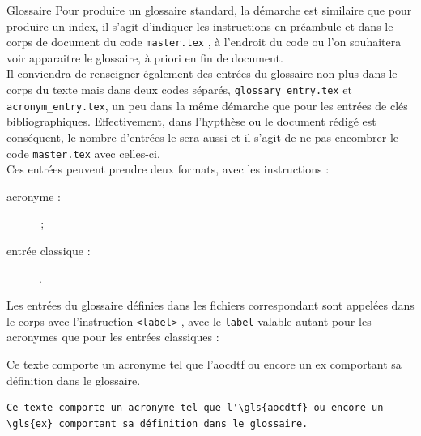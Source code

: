 \documentclass[a4paper, 11pt, twoside, fleqn]{memoir}
\begin{document}
\begin{exemple}{Glossaire}{}
Pour produire un glossaire standard, la démarche est similaire que pour produire un index, il s'agit d'indiquer les instructions \texttt{\makenoidxglossaries} en préambule et \texttt{\printnoidxglossary} dans le corps de document du code \texttt{master.tex} , à l'endroit du code ou l'on souhaitera voir apparaitre le glossaire, à priori en fin de document.\\

Il conviendra de renseigner également des entrées du glossaire non plus dans le corps du texte mais dans deux codes séparés, \texttt{glossary\_entry.tex} et \texttt{acronym\_entry.tex}, un peu dans la même démarche que pour les entrées de clés bibliographiques. Effectivement, dans l'hypthèse ou le document rédigé est conséquent, le nombre d'entrées le sera aussi et il s'agit de ne pas encombrer le code \texttt{master.tex} avec celles-ci.\\
 Ces entrées peuvent prendre deux formats, avec les instructions :
 \begin{description}
 \item[acronyme :]  \texttt{} \,;
 \item[entrée \og classique \fg{} :] \texttt{} .
 \end{description}

Les entrées du glossaire définies dans les fichiers correspondant sont appelées dans le corps avec l'instruction \texttt{\gls{<label>}} , avec le \texttt{label} valable autant pour les acronymes que pour les entrées \og classiques \fg{} :\\

\begin{minipage}[t]{0.49\linewidth}
Ce texte comporte un acronyme tel que l'\gls{aocdtf} ou encore un \gls{ex} comportant sa définition dans le glossaire.
\end{minipage}
	\hfill
\begin{minipage}[t]{0.49\linewidth}
\begin{verbatim}
Ce texte comporte un acronyme tel que l'\gls{aocdtf} ou encore un \gls{ex} comportant sa définition dans le glossaire.
\end{verbatim}
\end{minipage}


\end{exemple}
\end{document}
